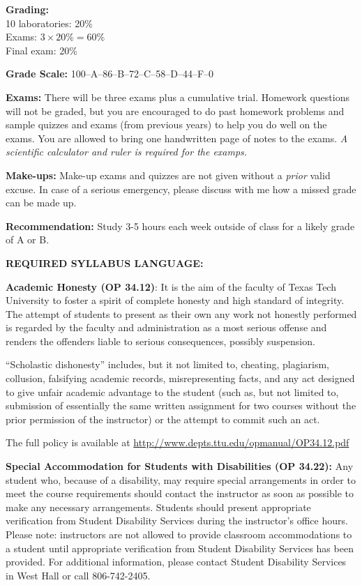 \documentclass[11pt]{NSF}
\begin{document}
{\bf Grading:}\\
10 laboratories: 20\%\\
Exams: $3\times 20\% = 60\%$\\
Final exam: 20\%

{\bf Grade Scale:} 100--A--86--B--72--C--58--D--44--F--0
 
{\bf Exams:}
There will be three exams plus a cumulative trial.
Homework questions will not be graded, but you are encouraged
to do past homework problems and sample quizzes and exams
(from previous years) to help you do well on the exams.
You are allowed to bring one handwritten page of notes to the exams.
{\em A scientific calculator and ruler is required for the 
examps.}

{\bf Make-ups:}
Make-up exams and quizzes are not given without a {\em prior} valid excuse.
In case of a serious emergency, please discuss with me how a missed
grade can be made up.

{\bf Recommendation:} 
Study 3-5 hours each week outside of class for a likely grade of A or B.

\newpage
{\bf REQUIRED SYLLABUS LANGUAGE:}

{\bf Academic Honesty (OP 34.12)}:
It is the aim of the faculty of Texas Tech University to foster a
spirit of complete honesty and high standard of integrity. The attempt
of students to present as their own any work not honestly performed is
regarded by the faculty and administration as a most serious offense
and renders the offenders liable to serious consequences, possibly
suspension. 

“Scholastic dishonesty” includes, but it not limited to,
cheating, plagiarism, collusion, falsifying academic records,
misrepresenting facts, and any act designed to give unfair academic
advantage to the student (such as, but not limited to, submission of
essentially the same written assignment for two courses without the
prior permission of the instructor) or the attempt to commit such an
act.  

The full policy is available at
\url{http://www.depts.ttu.edu/opmanual/OP34.12.pdf} 

{\bf Special Accommodation for Students with Disabilities 
(OP 34.22):} 
Any student who, because of
a disability, may require special arrangements in order to meet the
course requirements should contact the instructor as soon as possible
to make any necessary arrangements. Students should present
appropriate verification from Student Disability Services during the
instructor's office hours. Please note: instructors are not allowed to
provide classroom accommodations to a student until appropriate
verification from Student Disability Services has been provided. For
additional information, please contact Student Disability Services in
West Hall or call 806-742-2405.  
\end{document}
